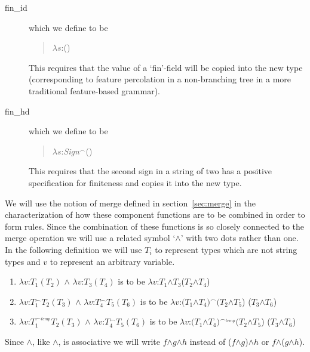 \begin{description}
\item[\textsf{fin\_id}] which we define to be
\begin{quote}
$\lambda s$:()
\end{quote}
\noindent This requires that the value of a `fin'-field will be copied
into the new type (corresponding to feature percolation in a
non-branching tree in a more traditional feature-based grammar).


\item[\textsf{fin\_hd}] which we define to be
\begin{quote}
$\lambda
s$:\textit{Sign}$^\frown$()
\end{quote}
\noindent This requires that the second sign in a string of two has a positive
specification for finiteness and copies it into the new type.

\end{description}

We will use the notion of merge defined in section~\ref{sec:merge} in
the characterization of how these component functions are to be
combined in order to form rules.  Since the combination of these
functions is so closely connected to the merge operation we will use
a related symbol `\d{\d{$\wedge$}}' with two dots rather than one.  In
the following definition we will use $T_i$ to represent types which
are not string types and $v$ to represent an arbitrary variable.
\begin{enumerate} 
 
\item $\lambda v$:$T_1(T_2)$ \d{\d{$\wedge$}} $\lambda v$:$T_3(T_4)$
  is to be $\lambda v$:$T_1$\d{$\wedge$}$T_3$($T_2$\d{$\wedge$}$T_4$)
 
\item $\lambda v$:$T_1^{\frown}{T_2}(T_3)$ \d{\d{$\wedge$}} $\lambda
  v$:$T_4^\frown T_5(T_6)$
  is to be $\lambda v$:$(T_1$\d{$\wedge$}$T_4)^\frown (T_2$\d{$\wedge$}$T_5$) ($T_3$\d{$\wedge$}$T_6$) 

\item $\lambda v$:$T_1^{\frown_\mathit{temp}}{T_2}(T_3)$ \d{\d{$\wedge$}} $\lambda
  v$:$T_4^\frown T_5(T_6)$
  is to be $\lambda v$:$(T_1$\d{$\wedge$}$T_4)^{\frown_\mathit{temp}} (T_2$\d{$\wedge$}$T_5$) ($T_3$\d{$\wedge$}$T_6$)  
\end{enumerate}
Since \d{\d{$\wedge$}}, like \d{$\wedge$}, is associative we will
write $f$\d{\d{$\wedge$}}$g$\d{\d{$\wedge$}}$h$ instead of
($f$\d{\d{$\wedge$}}$g$)\d{\d{$\wedge$}}$h$ or
$f$\d{\d{$\wedge$}}($g$\d{\d{$\wedge$}}$h$).

